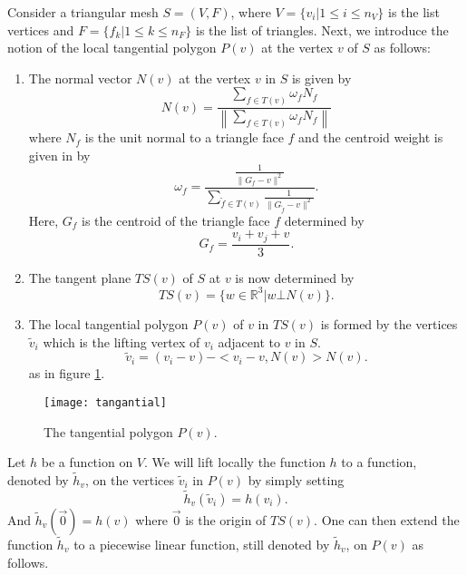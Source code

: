\documentclass{elsart}
\begin{document}
Consider a triangular mesh $S=(V,F)$, where $V=\{ v_i | 1 \leq i
\leq n_V \}$ is the list vertices and $F = \{ f_k | 1 \leq k \leq
n_F \}$ is the list of triangles. Next, we introduce the notion  of
the local tangential polygon $P(v)$ at the vertex $v$  of $S$ as
follows:
\begin{enumerate}
\item The normal vector $N(v)$ at the vertex $v$ in $S$ is given by
\begin{equation}\label{N_v}
N(v) = \frac{\sum_{f \in T(v)} \omega_fN_f}{\left \|\sum_{f \in
T(v)} \omega_fN_f \right \|}
\end{equation}
where $N_f$ is the unit normal to a triangle face $f$ and the
centroid weight is given in \cite{Chen1} by
\begin{equation}\label{omega_f}
\omega_f = \frac{\frac{1}{\| G_f - v \|^2}}{\sum_{\tilde{f} \in
T(v)}\frac{1}{\| G_{\tilde{f}} - v \|^2}}.
\end{equation}
Here, $G_f$ is the centroid of the triangle face $f$ determined by
\begin{equation}G_f = \frac{v_i+v_j+v}{3}.\end{equation}
\item The tangent plane $TS(v)$ of $S$ at $v$ is now determined by
\begin{equation}TS(v) = \{ w \in \mathbb{R}^3 | w \bot N(v)
\}.\end{equation}
\item The local tangential polygon $P(v)$ of $v$ in $TS(v)$ is formed by the vertices $\tilde{v}_i$ which is the lifting vertex of $v_i$ adjacent to $v$ in $S$.
\begin{equation} \tilde{v}_i = ( v_i-v) - < v_i - v, N(v)>N(v).\end{equation} as in figure
\ref{tangential}.
\end{enumerate}

\begin{figure}
{\center
\texttt{[image: tangantial]}
\caption{ The tangential polygon $P(v)$.} \label{tangential}
 }
\end{figure}

Let $h$ be a function on $V$. We will lift locally the function $h$
to a function, denoted by $\tilde{h}_v$, on the vertices
$\tilde{v}_i$ in $P(v)$ by simply setting
\begin{equation}
\tilde{h}_v(\tilde{v}_i) = h(v_i).
\end{equation} And $\tilde{h}_v(\vec{0}) = h(v)$ where $\vec{0}$ is the origin of
$TS(v)$. One can then extend the function $\tilde{h}_v$ to a
piecewise linear function, still denoted by $\tilde{h}_v$, on $P(v)$
as follows.
\end{document}
